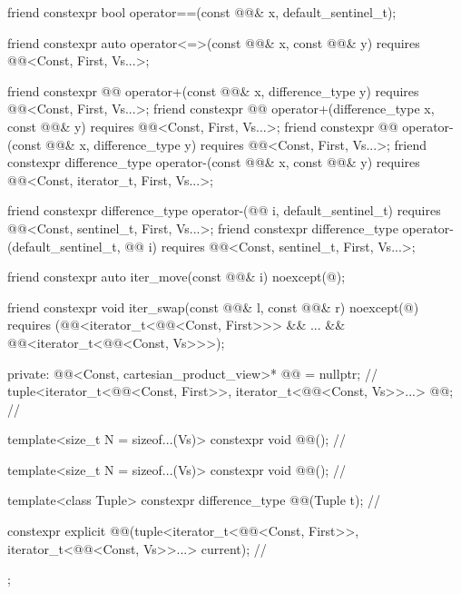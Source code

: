 \begin{codeblock}
{{    friend constexpr bool operator==(const @@& x, default_sentinel_t);

    friend constexpr auto operator<=>(const @@& x, const @@& y)
      requires @@<Const, First, Vs...>;

    friend constexpr @@ operator+(const @@& x, difference_type y)
      requires @@<Const, First, Vs...>;
    friend constexpr @@ operator+(difference_type x, const @@& y)
      requires @@<Const, First, Vs...>;
    friend constexpr @@ operator-(const @@& x, difference_type y)
      requires @@<Const, First, Vs...>;
    friend constexpr difference_type operator-(const @@& x, const @@& y)
      requires @@<Const, iterator_t, First, Vs...>;

    friend constexpr difference_type operator-(@@ i, default_sentinel_t)
      requires @@<Const, sentinel_t, First, Vs...>;
    friend constexpr difference_type operator-(default_sentinel_t, @@ i)
      requires @@<Const, sentinel_t, First, Vs...>;

    friend constexpr auto iter_move(const @@& i) noexcept(@\seebelow@);

    friend constexpr void iter_swap(const @@& l, const @@& r) noexcept(@\seebelow@)
      requires (@@<iterator_t<@@<Const, First>>> && ... &&
        @@<iterator_t<@@<Const, Vs>>>);

  private:
    @@<Const, cartesian_product_view>* @@ = nullptr;      // \expos
    tuple<iterator_t<@@<Const, First>>,
      iterator_t<@@<Const, Vs>>...> @@;                  // \expos

    template<size_t N = sizeof...(Vs)>
      constexpr void @@();                                            // \expos

    template<size_t N = sizeof...(Vs)>
      constexpr void @@();                                            // \expos

    template<class Tuple>
      constexpr difference_type @@(Tuple t);                 // \expos

    constexpr explicit @@(tuple<iterator_t<@@<Const, First>>,
      iterator_t<@@<Const, Vs>>...> current);                  // \expos
  };
}
\end{codeblock}

